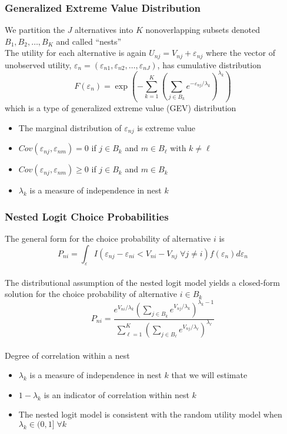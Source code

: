 \documentclass{beamer}
\begin{document}
\begin{frame}\frametitle{Generalized Extreme Value Distribution}
    We partition the $J$ alternatives into $K$ nonoverlapping subsets denoted $B_1, B_2, \ldots, B_K$ and called ``nests'' \\
    \vspace{2ex}
    The utility for each alternative is again $U_{nj} = V_{nj} + \varepsilon_{nj}$ where the vector of unobserved utility, $\varepsilon_n = (\varepsilon_{n1}, \varepsilon_{n2}, \ldots, \varepsilon_{nJ})$, has cumulative distribution
    $$F(\varepsilon_n) = \exp \left( -\sum_{k = 1}^K \left( \sum_{j \in B_k} e^{-\varepsilon_{nj} / \lambda_k} \right)^{\lambda_k} \right)$$
    which is a type of generalized extreme value (GEV) distribution
    \begin{itemize}
    	\item The marginal distribution of $\varepsilon_{nj}$ is extreme value 
    	\item $Cov(\varepsilon_{nj}, \varepsilon_{nm}) = 0$ if $j \in B_k$ and $m \in B_{\ell}$ with $k \neq \ell$
    	\item $Cov(\varepsilon_{nj}, \varepsilon_{nm}) \geq 0$ if $j \in B_k$ and $m \in B_k$
    	\item $\lambda_k$ is a measure of independence in nest $k$
    \end{itemize}
\end{frame}

\begin{frame}\frametitle{Nested Logit Choice Probabilities}
	The general form for the choice probability of alternative $i$ is
	$$P_{ni} = \int_\varepsilon I(\varepsilon_{nj} - \varepsilon_{ni} < V_{ni} - V_{nj} \; \forall j \neq i) f(\varepsilon_n) d\varepsilon_n$$ \\
	\vspace{2ex}
	The distributional assumption of the nested logit model yields a closed-form solution for the choice probability of alternative $i \in B_k$
	$$P_{ni} = \frac{e^{V_{ni} / \lambda_k} \left( \sum_{j \in B_k} e^{V_{nj} / \lambda_k} \right)^{\lambda_k - 1}}{\sum_{\ell = 1}^K \left( \sum_{j \in B_{\ell}} e^{V_{nj} / \lambda_{\ell}} \right)^{\lambda_{\ell}}}$$ \\
	\vspace{2ex}
	Degree of correlation within a nest
	\begin{itemize}
		\item $\lambda_k$ is a measure of independence in nest $k$ that we will estimate
    	\item $1 - \lambda_k$ is an indicator of correlation within nest $k$
    	\item The nested logit model is consistent with the random utility model when $\lambda_k \in (0, 1] \; \forall k$
	\end{itemize}
\end{frame}
\end{document}

